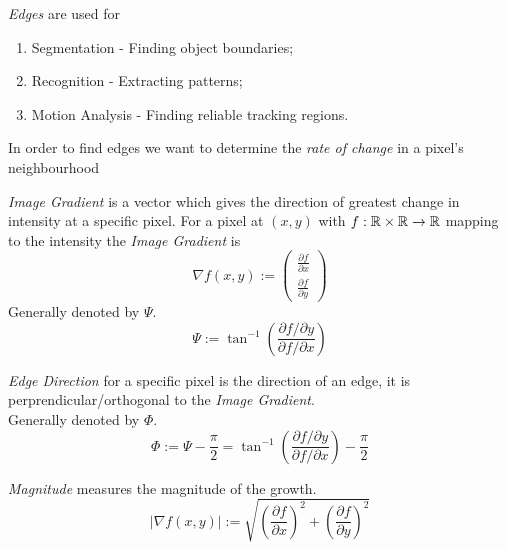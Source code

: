 \documentclass[11pt,a4paper]{article}
\begin{document}
\textit{Edges} are used for
\begin{enumerate}[label=\roman*)]
	\item Segmentation - Finding object boundaries;
	\item Recognition - Extracting patterns;
	\item Motion Analysis - Finding reliable tracking regions.
\end{enumerate}

In order to find edges we want to determine the \textit{rate of change} in a pixel's neighbourhood

\textit{Image Gradient} is a vector which gives the direction of greatest change in intensity at a specific pixel. For a pixel at $(x,y)$ with $f:\mathbb{R}\times\mathbb{R}\to\mathbb{R}$ mapping to the intensity the \textit{Image Gradient} is
$$\nabla f(x,y):=\begin{pmatrix}
\frac{\partial f}{\partial x}\\
\frac{\partial f}{\partial y}
\end{pmatrix}$$
\nb Generally denoted by $\Psi$.\\

$$\Psi:=\tan^{-1}\left(\dfrac{\partial f/\partial y}{\partial f/\partial x}\right)$$

\textit{Edge Direction} for a specific pixel is the direction of an edge, it is perprendicular/orthogonal to the \textit{Image Gradient}.\\
\nb Generally denoted by $\Phi$.\\
$$\Phi:=\Psi-\frac{\pi}{2}=\tan^{-1}\left(\dfrac{\partial f/\partial y}{\partial f/\partial x}\right)-\dfrac{\pi}{2}$$

\textit{Magnitude} measures the magnitude of the growth.
$$|\nabla f(x,y)|:=\sqrt{\left(\dfrac{\partial f}{\partial x}\right)^2+\left(\dfrac{\partial f}{\partial y}\right)^2}$$
\end{document}
